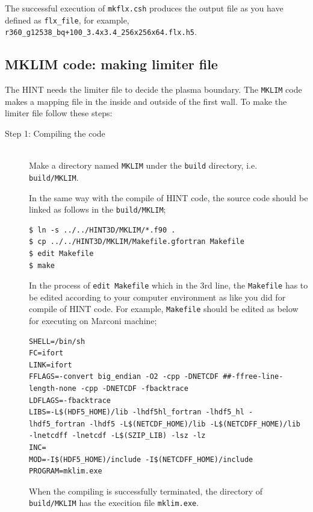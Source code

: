 \documentclass[10pt]{ltxdoc} %
\begin{document}
The successful execution of \texttt{mkflx.csh} produces the output file as you have defined as \texttt{flx\_file}, for example, \texttt{r360\_g12538\_bq+100\_3.4x3.4\_256x256x64.flx.h5}. 



\subsection{MKLIM code: making limiter file}
The HINT needs the limiter file to decide the plasma boundary. The \texttt{MKLIM} code makes a mapping file in the inside and outside of the first wall. To make the limiter file follow these steps:
\begin{description}
 \item[Step 1: Compiling the code]\mbox{}\\
  Make a directory named \texttt{MKLIM} under the \texttt{build} directory, i.e. \texttt{build/MKLIM}. 

In the same way with the compile of HINT code, the source code should be linked as follows in the \texttt{build/MKLIM};
\vspace{2mm}
\begin{verbatim}
$ ln -s ../../HINT3D/MKLIM/*.f90 .
$ cp ../../HINT3D/MKLIM/Makefile.gfortran Makefile
$ edit Makefile
$ make
\end{verbatim}
\vspace{2mm}

In the process of \texttt{edit Makefile} which in the 3rd line, the \texttt{Makefile} has to be edited according to your computer environment as like you did for compile of HINT code. 
For example, \texttt{Makefile} should be edited as below for executing on Marconi machine;
\vspace{2mm}
\begin{verbatim}
SHELL=/bin/sh
FC=ifort
LINK=ifort
FFLAGS=-convert big_endian -O2 -cpp -DNETCDF ##-ffree-line-length-none -cpp -DNETCDF -fbacktrace
LDFLAGS=-fbacktrace
LIBS=-L$(HDF5_HOME)/lib -lhdf5hl_fortran -lhdf5_hl -lhdf5_fortran -lhdf5 -L$(NETCDF_HOME)/lib -L$(NETCDFF_HOME)/lib -lnetcdff -lnetcdf -L$(SZIP_LIB) -lsz -lz
INC=
MOD=-I$(HDF5_HOME)/include -I$(NETCDFF_HOME)/include
PROGRAM=mklim.exe
\end{verbatim}
\vspace{2mm}

When the compiling is successfully terminated, the directory of \texttt{build/MKLIM} has the execition file \texttt{mklim.exe}.


\end{description}
\end{document}
